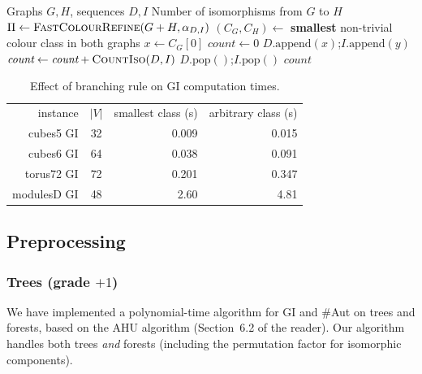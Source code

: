 \documentclass[twoside]{article}
\begin{document}
\begin{algorithm}[H]
\caption{CountIsomorphisms with Smallest-Class Branching (Algorithm~2)}\label{alg:count_iso}
\begin{algorithmic}[1]
\Require Graphs $G, H$, sequences $D, I$
\Ensure Number of isomorphisms from $G$ to $H$
    \State $\Pi \gets \textsc{FastColourRefine}(G + H, \alpha_{D,I})$
      \EndIf
      \EndIf
    \State $(C_G, C_H) \gets$ \textbf{smallest} non-trivial colour class in both graphs
    \State $x \gets C_G[0]$
    \State $\textit{count} \gets 0$
        \State $D.\text{append}(x)$;\quad $I.\text{append}(y)$
        \State $\textit{count} \gets \textit{count} + \Call{CountIso}{D, I}$
        \State $D.\text{pop}()$;\quad $I.\text{pop}()$
    \EndFor
    \State \Return $\textit{count}$
\EndFunction
\end{algorithmic}
\end{algorithm}

\begin{table}[H]
\centering
\begin{tabular}{r|c|r|r}
instance & $|V|$ & smallest class (s) & arbitrary class (s) \\
\noalign{\smallskip}\hline\hline\noalign{\smallskip}
cubes5 GI     & 32 & 0.009 & 0.015 \\
cubes6 GI     & 64 & 0.038 & 0.091 \\
torus72 GI    & 72 & 0.201 & 0.347 \\
modulesD GI   & 48 & 2.60  & 4.81  \\
\end{tabular}
\caption{Effect of branching rule on GI computation times.}
\label{tab:branching_rule}
\end{table}

\subsection{Preprocessing}

\subsubsection{Trees (grade $+1$)}
We have implemented a polynomial-time algorithm for GI and \#Aut on trees and forests, based on the AHU algorithm (Section~6.2 of the reader). Our algorithm handles both trees \emph{and} forests (including the permutation factor for isomorphic components).
\end{document}
